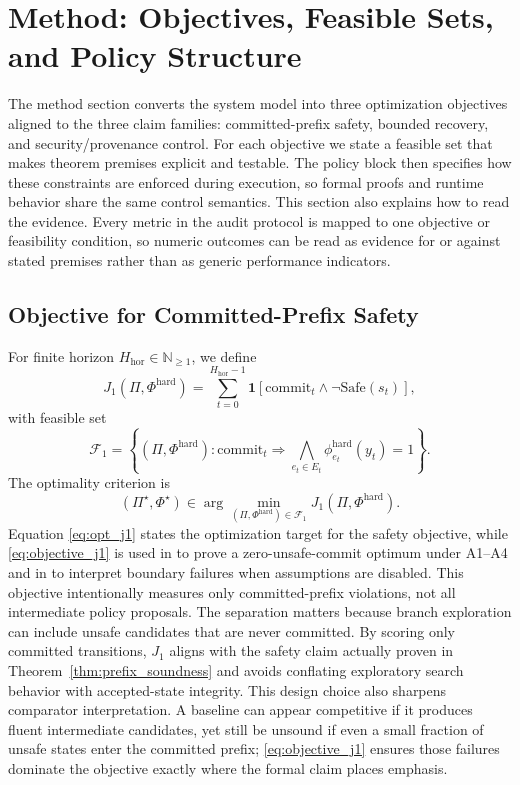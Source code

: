 \documentclass{article} %
\begin{document}
\section{Method: Objectives, Feasible Sets, and Policy Structure}
\label{sec:method}
The method section converts the system model into three optimization objectives aligned to the three claim families: committed-prefix safety, bounded recovery, and security/provenance control. For each objective we state a feasible set that makes theorem premises explicit and testable. The policy block then specifies how these constraints are enforced during execution, so formal proofs and runtime behavior share the same control semantics.
This section also explains how to read the evidence. Every metric in the audit protocol is mapped to one objective or feasibility condition, so numeric outcomes can be read as evidence for or against stated premises rather than as generic performance indicators.

\subsection{Objective for Committed-Prefix Safety}
For finite horizon $H_{\mathrm{hor}}\in\mathbb{N}_{\ge1}$, we define
\begin{equation}
J_1(\Pi,\Phi^{\mathrm{hard}})=\sum_{t=0}^{H_{\mathrm{hor}}-1}\mathbf{1}\!\left[\mathrm{commit}_t \land \neg \mathrm{Safe}(s_t)\right],
\label{eq:objective_j1}
\end{equation}
with feasible set
\begin{equation}
\mathcal{F}_1=\left\{(\Pi,\Phi^{\mathrm{hard}}):\mathrm{commit}_t\Rightarrow\bigwedge_{e_t\in E_t}\phi^{\mathrm{hard}}_{e_t}(y_t)=1\right\}.
\label{eq:feasible_f1}
\end{equation}
The optimality criterion is
\begin{equation}
(\Pi^\star,\Phi^{\star})\in\arg\min_{(\Pi,\Phi^{\mathrm{hard}})\in\mathcal{F}_1}J_1(\Pi,\Phi^{\mathrm{hard}}).
\label{eq:opt_j1}
\end{equation}
Equation \eqref{eq:opt_j1} states the optimization target for the safety objective, while \eqref{eq:objective_j1} is used in  to prove a zero-unsafe-commit optimum under A1--A4 and in  to interpret boundary failures when assumptions are disabled.
This objective intentionally measures only committed-prefix violations, not all intermediate policy proposals. The separation matters because branch exploration can include unsafe candidates that are never committed. By scoring only committed transitions, $J_1$ aligns with the safety claim actually proven in Theorem~\ref{thm:prefix_soundness} and avoids conflating exploratory search behavior with accepted-state integrity.
This design choice also sharpens comparator interpretation. A baseline can appear competitive if it produces fluent intermediate candidates, yet still be unsound if even a small fraction of unsafe states enter the committed prefix; \eqref{eq:objective_j1} ensures those failures dominate the objective exactly where the formal claim places emphasis.
\end{document}
